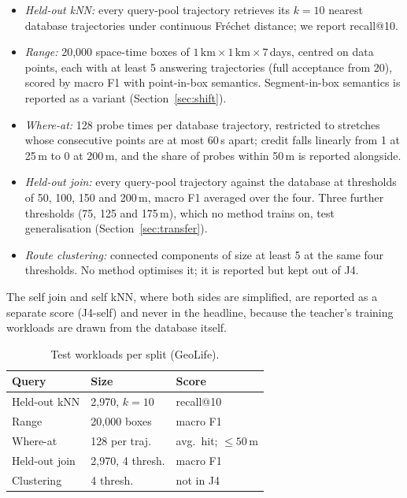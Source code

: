 \documentclass[conference]{IEEEtran}
\begin{document}
\begin{itemize}
\item \emph{Held-out kNN:} every query-pool trajectory retrieves its $k = 10$ nearest database
trajectories under continuous Fr\'echet distance; we report recall@10.
\item \emph{Range:} 20{,}000 space-time boxes of $1\,\mathrm{km} \times 1\,\mathrm{km} \times
7$\,days, centred on data points, each with at least 5 answering trajectories (full acceptance from
20), scored by macro F1 with point-in-box semantics. Segment-in-box semantics is reported as a
variant (Section~\ref{sec:shift}).
\item \emph{Where-at:} 128 probe times per database trajectory, restricted to stretches whose
consecutive points are at most 60\,s apart; credit falls linearly from 1 at 25\,m to 0 at 200\,m,
and the share of probes within 50\,m is reported alongside.
\item \emph{Held-out join:} every query-pool trajectory against the database at thresholds of 50,
100, 150 and 200\,m, macro F1 averaged over the four. Three further thresholds (75, 125 and 175\,m),
which no method trains on, test generalisation (Section~\ref{sec:transfer}).
\item \emph{Route clustering:} connected components of size at least 5 at the same four
thresholds. No method optimises it; it is reported but kept out of J4.
\end{itemize}

The self join and self kNN, where both sides are simplified, are reported as a separate score
(J4-self) and never in the headline, because the teacher's training workloads are drawn from the
database itself.

\begin{table}[t]
\centering
\caption{Test workloads per split (GeoLife).}
\label{tab:workloads}
\small
\begin{tabular}{@{}lll@{}}
\toprule
Query & Size & Score \\
\midrule
Held-out kNN & 2{,}970, $k = 10$ & recall@10 \\
Range & 20{,}000 boxes & macro F1 \\
Where-at & 128 per traj. & avg.\ hit; $\le 50$\,m \\
Held-out join & 2{,}970, 4 thresh. & macro F1 \\
Clustering & 4 thresh. & not in J4 \\
\bottomrule
\end{tabular}
\end{table}
\end{document}
